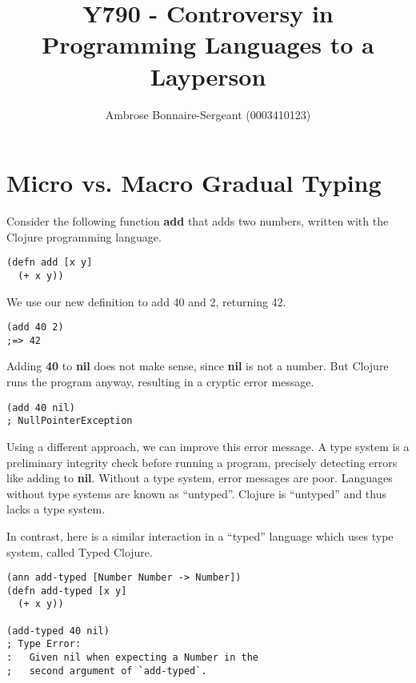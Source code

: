 \documentclass[10pt]{article}
\begin{document}
\title{Y790 - Controversy in Programming Languages to a Layperson}
\author{Ambrose Bonnaire-Sergeant (0003410123)}

\maketitle

\section{Micro vs. Macro Gradual Typing}

Consider the following function \textbf{add} that adds two numbers, written
with the Clojure programming language.

\begin{verbatim}
(defn add [x y]
  (+ x y))
\end{verbatim}

We {\color{red}use} our new definition to add 40 and 2, returning 42.

\begin{verbatim}
(add 40 2)
;=> 42
\end{verbatim}

Adding \textbf{40} to \textbf{nil} does not make sense, since \textbf{nil} is not a number.
But Clojure runs the program anyway, resulting in a cryptic error message.

\begin{verbatim}
(add 40 nil)
; NullPointerException
\end{verbatim}

{\color{red}Using a different approach, we can improve this error message.}
A type system {\color{red}is a} preliminary integrity check before running a program, precisely detecting errors like adding to \textbf{nil}.
{\color{red}Without a type system, error messages are poor.}
Languages without type systems are known as ``untyped''.
{\color{red}Clojure is ``untyped'' and thus lacks a type system.}

In contrast, {\color{red}here is a similar interaction} in a ``typed'' language which uses type system, called Typed Clojure.

\begin{verbatim}
(ann add-typed [Number Number -> Number])
(defn add-typed [x y]
  (+ x y))

(add-typed 40 nil)
; Type Error:
:   Given nil when expecting a Number in the
;   second argument of `add-typed`.
\end{verbatim}
\end{document}
